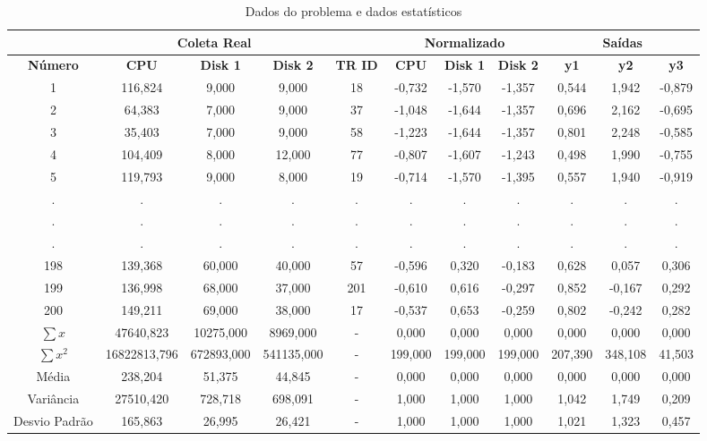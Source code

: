 \documentclass[11pt,a4paper,openany,oneside]{abntex2}
\begin{document}
	\begin{table}[H]
		\caption{Dados do problema e dados estatísticos}
		\centering
		\begin{tabular}{|c|c|c|c|c|c|c|c|c|c|c|}
			\hline
			\textbf{} & \multicolumn{ 3}{c|}{\textbf{Coleta Real}} & \textbf{} & \multicolumn{ 3}{c|}{\textbf{Normalizado}} & \multicolumn{ 3}{c|}{\textbf{Saídas}} \\ \hline
			\textbf{Número} & \textbf{CPU} & \textbf{Disk 1} & \textbf{Disk 2} & \textbf{TR ID } & \textbf{CPU} & \textbf{Disk 1} & \textbf{Disk 2} & \textbf{y1} & \textbf{y2} & \textbf{y3} \\ \hline
			1 & 116,824 & 9,000 & 9,000 & 18 & -0,732 & -1,570 & -1,357 & 0,544 & 1,942 & -0,879 \\ \hline
			2 & 64,383 & 7,000 & 9,000 & 37 & -1,048 & -1,644 & -1,357 & 0,696 & 2,162 & -0,695 \\ \hline
			3 & 35,403 & 7,000 & 9,000 & 58 & -1,223 & -1,644 & -1,357 & 0,801 & 2,248 & -0,585 \\ \hline
			4 & 104,409 & 8,000 & 12,000 & 77 & -0,807 & -1,607 & -1,243 & 0,498 & 1,990 & -0,755 \\ \hline
			5 & 119,793 & 9,000 & 8,000 & 19 & -0,714 & -1,570 & -1,395 & 0,557 & 1,940 & -0,919 \\ \hline
			. & . & . & . & . & . & . & . & . & . & . \\ \hline
			. & . & . & . & . & . & . & . & . & . & . \\ \hline
			. & . & . & . & . & . & . & . & . & . & . \\ \hline
			198 & 139,368 & 60,000 & 40,000 & 57 & -0,596 & 0,320 & -0,183 & 0,628 & 0,057 & 0,306 \\ \hline
			199 & 136,998 & 68,000 & 37,000 & 201 & -0,610 & 0,616 & -0,297 & 0,852 & -0,167 & 0,292 \\ \hline
			200 & 149,211 & 69,000 & 38,000 & 17 & -0,537 & 0,653 & -0,259 & 0,802 & -0,242 & 0,282 \\ \hline
			$\sum x$ & 47640,823 & 10275,000 & 8969,000 & - & 0,000 &0,000& 0,000 & 0,000 & 0,000 & 0,000 \\ \hline
			$\sum x^{2}$    & 16822813,796 & 672893,000 & 541135,000 & - & 199,000 & 199,000 & 199,000 & 207,390 & 348,108 & 41,503 \\ \hline
			Média & 238,204 & 51,375 & 44,845 & - & 0,000 & 0,000 & 0,000 & 0,000 & 0,000 & 0,000 \\ \hline
			Variância & 27510,420 & 728,718 & 698,091 & - & 1,000 & 1,000 & 1,000 & 1,042 & 1,749 & 0,209 \\ \hline
			Desvio Padrão & 165,863 & 26,995 & 26,421 & - & 1,000 & 1,000 & 1,000 & 1,021 & 1,323 & 0,457 \\ \hline
		\end{tabular}
		\label{dados}
	\end{table}
\end{document}
